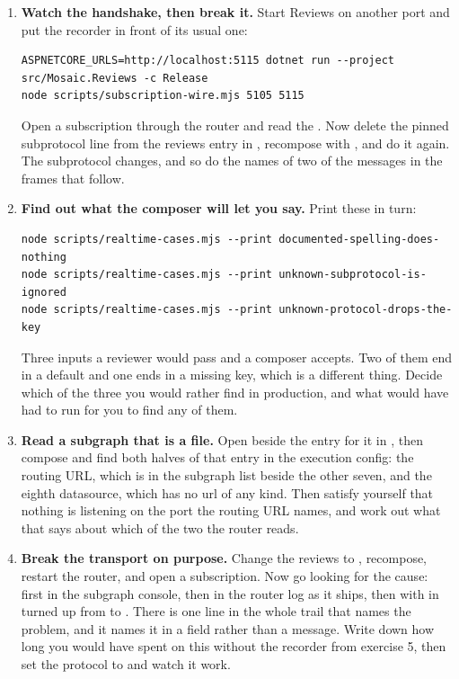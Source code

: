 \begin{enumerate}
  \item \textbf{Watch the handshake, then break it.} Start Reviews on another
  port and put the recorder in front of its usual one:

  \begin{verbatim}
ASPNETCORE_URLS=http://localhost:5115 dotnet run --project src/Mosaic.Reviews -c Release
node scripts/subscription-wire.mjs 5105 5115
  \end{verbatim}

  Open a subscription through the router and read the . Now delete
  the pinned subprotocol line from the reviews entry in
  , recompose with , and do
  it again. The subprotocol changes, and so do the names of two of the messages
  in the frames that follow.

  \item \textbf{Find out what the composer will let you say.} Print these in
  turn:

  \begin{verbatim}
node scripts/realtime-cases.mjs --print documented-spelling-does-nothing
node scripts/realtime-cases.mjs --print unknown-subprotocol-is-ignored
node scripts/realtime-cases.mjs --print unknown-protocol-drops-the-key
  \end{verbatim}

  Three inputs a reviewer would pass and a composer accepts. Two of them end in
  a default and one ends in a missing key, which is a different thing. Decide
  which of the three you would rather find in production, and what would have
  had to run for you to find any of them.

  \item \textbf{Read a subgraph that is a file.} Open
   beside the entry for it in
  , then compose and find both halves of that
  entry in the execution config: the routing URL, which is in the subgraph list
  beside the other seven, and the eighth datasource, which has no url of any
  kind. Then satisfy yourself that nothing is listening on the port the routing
  URL names, and work out what that says about which of the two the router
  reads.

  \item \textbf{Break the transport on purpose.} Change the reviews
   to , recompose, restart the router, and open a
  subscription. Now go looking for the cause: first in the subgraph console,
  then in the router log as it ships, then with  in
   turned up from  to . There
  is one line in the whole trail that names the problem, and it names it in a
  field rather than a message. Write down how long you would have spent on this
  without the recorder from exercise 5, then set the protocol to
   and watch it work.


\end{enumerate}
